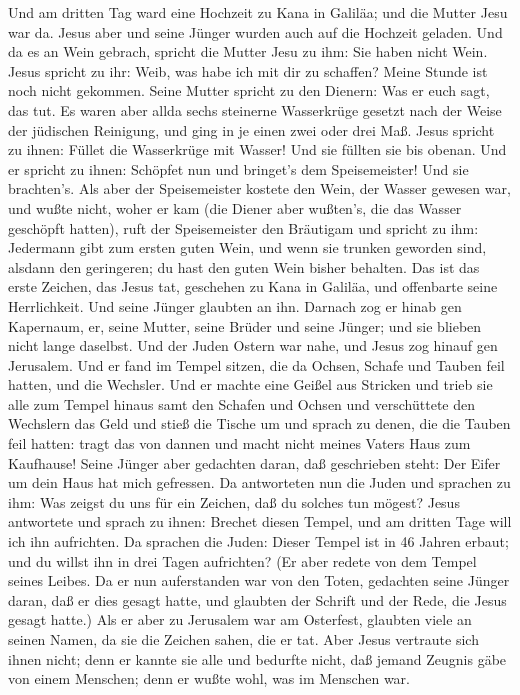  Und am dritten Tag ward eine Hochzeit zu Kana in Galiläa;
und die Mutter Jesu war da.  Jesus aber und seine Jünger
wurden auch auf die Hochzeit geladen.  Und da es an Wein
gebrach, spricht die Mutter Jesu zu ihm: Sie haben nicht Wein.
 Jesus spricht zu ihr: Weib, was habe ich mit dir zu
schaffen? Meine Stunde ist noch nicht gekommen.  Seine
Mutter spricht zu den Dienern: Was er euch sagt, das tut. 
Es waren aber allda sechs steinerne Wasserkrüge gesetzt nach der Weise
der jüdischen Reinigung, und ging in je einen zwei oder drei Maß.
 Jesus spricht zu ihnen: Füllet die Wasserkrüge mit Wasser!
Und sie füllten sie bis obenan.  Und er spricht zu ihnen:
Schöpfet nun und bringet's dem Speisemeister! Und sie brachten's.
 Als aber der Speisemeister kostete den Wein, der Wasser
gewesen war, und wußte nicht, woher er kam (die Diener aber wußten's,
die das Wasser geschöpft hatten), ruft der Speisemeister den Bräutigam
 und spricht zu ihm: Jedermann gibt zum ersten guten Wein,
und wenn sie trunken geworden sind, alsdann den geringeren; du hast den
guten Wein bisher behalten.  Das ist das erste Zeichen, das
Jesus tat, geschehen zu Kana in Galiläa, und offenbarte seine
Herrlichkeit. Und seine Jünger glaubten an ihn.  Darnach
zog er hinab gen Kapernaum, er, seine Mutter, seine Brüder und seine
Jünger; und sie blieben nicht lange daselbst.  Und der
Juden Ostern war nahe, und Jesus zog hinauf gen Jerusalem. 
Und er fand im Tempel sitzen, die da Ochsen, Schafe und Tauben feil
hatten, und die Wechsler.  Und er machte eine Geißel aus
Stricken und trieb sie alle zum Tempel hinaus samt den Schafen und
Ochsen und verschüttete den Wechslern das Geld und stieß die Tische um
 und sprach zu denen, die die Tauben feil hatten: tragt das
von dannen und macht nicht meines Vaters Haus zum Kaufhause!
 Seine Jünger aber gedachten daran, daß geschrieben steht:
Der Eifer um dein Haus hat mich gefressen.  Da antworteten
nun die Juden und sprachen zu ihm: Was zeigst du uns für ein Zeichen,
daß du solches tun mögest?  Jesus antwortete und sprach zu
ihnen: Brechet diesen Tempel, und am dritten Tage will ich ihn
aufrichten.  Da sprachen die Juden: Dieser Tempel ist in 46
Jahren erbaut; und du willst ihn in drei Tagen aufrichten? 
(Er aber redete von dem Tempel seines Leibes.  Da er nun
auferstanden war von den Toten, gedachten seine Jünger daran, daß er
dies gesagt hatte, und glaubten der Schrift und der Rede, die Jesus
gesagt hatte.)  Als er aber zu Jerusalem war am Osterfest,
glaubten viele an seinen Namen, da sie die Zeichen sahen, die er tat.
 Aber Jesus vertraute sich ihnen nicht; denn er kannte sie
alle  und bedurfte nicht, daß jemand Zeugnis gäbe von einem
Menschen; denn er wußte wohl, was im Menschen war.

